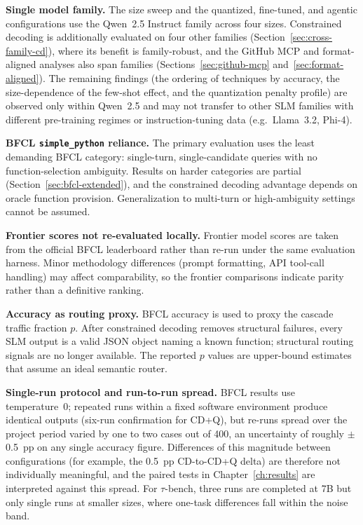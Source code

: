 \textbf{Single model family.}
The size sweep and the quantized, fine-tuned, and agentic configurations
use the Qwen~2.5 Instruct family across four sizes. Constrained decoding
is additionally evaluated on four other families
(Section~\ref{sec:cross-family-cd}), where its benefit is family-robust,
and the GitHub MCP and format-aligned analyses also span families
(Sections~\ref{sec:github-mcp} and~\ref{sec:format-aligned}). The
remaining findings (the ordering of techniques by accuracy, the
size-dependence of the few-shot effect, and the quantization penalty
profile) are observed only within Qwen~2.5 and may not transfer to other
SLM families with different pre-training regimes or instruction-tuning
data (e.g.\ Llama~3.2, Phi-4).

\textbf{BFCL \texttt{simple\_python} reliance.}
The primary evaluation uses the least demanding BFCL category:
single-turn, single-candidate queries with no function-selection
ambiguity. Results on harder categories are partial (Section~\ref{sec:bfcl-extended}),
and the constrained decoding advantage depends on oracle function
provision. Generalization to multi-turn or high-ambiguity settings
cannot be assumed.

\textbf{Frontier scores not re-evaluated locally.}
Frontier model scores are taken from the official BFCL leaderboard
rather than re-run under the same evaluation harness. Minor
methodology differences (prompt formatting, API tool-call handling)
may affect comparability, so the frontier comparisons indicate parity
rather than a definitive ranking.

\textbf{Accuracy as routing proxy.}
BFCL accuracy is used to proxy the cascade traffic fraction $p$.
After constrained decoding removes structural failures, every SLM
output is a valid JSON object naming a known function; structural
routing signals are no longer available. The reported $p$ values are
upper-bound estimates that assume an ideal semantic router.

\textbf{Single-run protocol and run-to-run spread.}
BFCL results use temperature~0; repeated runs within a fixed software
environment produce identical outputs (six-run confirmation for CD+Q),
but re-runs spread over the project period varied by one to two cases
out of 400, an uncertainty of roughly $\pm$0.5~pp on any single
accuracy figure. Differences of this magnitude between configurations
(for example, the 0.5~pp CD-to-CD+Q delta) are therefore not
individually meaningful, and the paired tests in
Chapter~\ref{ch:results} are interpreted against this spread. For
$\tau$-bench, three runs are completed at 7B but only single runs at
smaller sizes, where one-task differences fall within the noise band.

